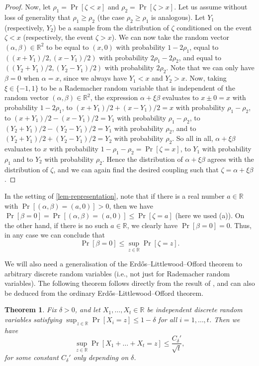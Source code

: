 \documentclass[english]{article}
\newtheorem{theorem}{Theorem}[section]
\theoremstyle{remark}
\numberwithin{equation}{section}
\numberwithin{figure}{section}
\newcommand{\RR}{\mathbb{R}}
\begin{document}
\begin{proof}
    Now, let $\rho_1=\Pr[\zeta< x]$ and $\rho_2=\Pr[\zeta> x]$. Let us assume without loss of generality that $\rho_1\ge \rho_2$ (the case $\rho_2\ge \rho_1$ is analogous). Let $Y_1$ (respectively, $Y_2$) be a sample from the distribution of $\zeta$ conditioned on the event $\zeta< x$ (respectively, the event $\zeta>x$). We can now take the random vector $(\alpha,\beta)\in \RR^2$ to be equal to $(x,0)$ with probability $1-2\rho_1$, equal to $((x+Y_1)/2,(x-Y_1)/2)$ with probability $2\rho_1-2\rho_2$, and equal to $((Y_2+Y_1)/2,(Y_2-Y_1)/2)$ with probability $2\rho_2$. Note that we can only have $\beta=0$ when $\alpha=x$, since we always have $Y_1<x$ and $Y_2>x$. Now, taking $\xi\in\{-1,1\}$ to be a Rademacher random variable that is independent of the random vector $(\alpha,\beta)\in \RR^2$, the expression $\alpha+\xi \beta$ evaluates to $x\pm 0=x$ with probability $1-2\rho_1$, to $(x+Y_1)/2+(x-Y_1)/2=x$ with probability $\rho_1-\rho_2$, to $(x+Y_1)/2-(x-Y_1)/2=Y_1$ with probability $\rho_1-\rho_2$, to $(Y_2+Y_1)/2-(Y_2-Y_1)/2=Y_1$ with probability $\rho_2$, and to $(Y_2+Y_1)/2+(Y_2-Y_1)/2=Y_2$ with probability $\rho_2$. So all in all, $\alpha+\xi \beta$ evaluates to $x$ with probability $1-\rho_1-\rho_2=\Pr[\zeta= x]$, to $Y_1$ with probability $\rho_1$ and to $Y_2$ with probability $\rho_2$. Hence the distribution of $\alpha+\xi \beta$ agrees with the distribution of $\zeta$, and we can again find the desired coupling such that $\zeta=\alpha+\xi \beta$.
\end{proof}

In the setting of \cref{lem-representation}, note that if there is a real number $a\in \RR$ with $\Pr[(\alpha,\beta)=(a,0)]>0$, then we have $\Pr[\beta=0]=\Pr[(\alpha,\beta)=(a,0)]\le \Pr[\zeta=a]$ (here we used (a)). On the other hand, if there is no such $a\in \RR$, we clearly have $\Pr[\beta=0]=0$. Thus, in any case we can conclude that
\begin{equation}\label{eq:prob-beta-zero}
    \Pr[\beta=0] \le \sup_{z\in \RR}\Pr[\zeta=z].
\end{equation}

We will also need a generalisation of the Erd\H os--Littlewood--Offord theorem to arbitrary discrete random variables (i.e., not just for Rademacher random variables). The following theorem follows directly from the result of \cite{Kol58}, and can also be deduced from the ordinary Erd\H os--Littlewood--Offord theorem.

\begin{theorem}\label{thm:general-ELO}
    Fix $\delta>0$, and let $X_1,\dots,X_t\in \RR$ be independent discrete random variables satisfying $\sup_{z\in \RR}\Pr[X_i=z]\le 1-\delta$ for all $i=1,\dots,t$. Then we have
    \[
\sup_{z\in \RR}\Pr[X_1+\dots+X_t=z]\le\frac{C_\delta'}{\sqrt{t}},
\]
for some constant $C_\delta'$ only depending on $\delta$.
\end{theorem}
\end{document}
